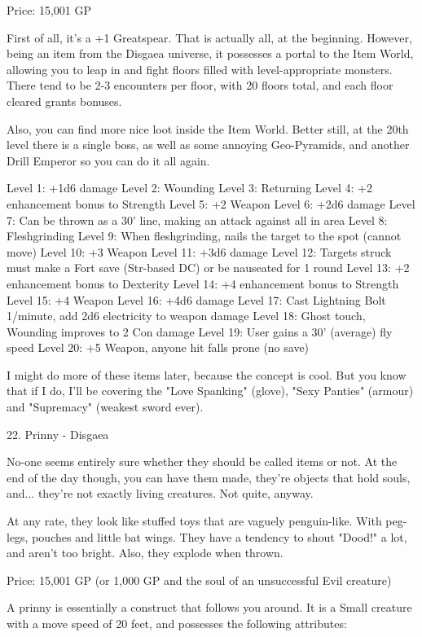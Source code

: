 \begin{multicols}{2}
Price: 15,001 GP

First of all, it's a +1 Greatspear. That is actually all, at the beginning. However, being an item from the Disgaea universe, it possesses a portal to the Item World, allowing you to leap in and fight floors filled with level-appropriate monsters. There tend to be 2-3 encounters per floor, with 20 floors total, and each floor cleared grants bonuses.

Also, you can find more nice loot inside the Item World. Better still, at the 20th level there is a single boss, as well as some annoying Geo-Pyramids, and another Drill Emperor so you can do it all again.

Level 1: +1d6 damage
Level 2: Wounding
Level 3: Returning
Level 4: +2 enhancement bonus to Strength
Level 5: +2 Weapon
Level 6: +2d6 damage
Level 7: Can be thrown as a 30' line, making an attack against all in area
Level 8: Fleshgrinding
Level 9: When fleshgrinding, nails the target to the spot (cannot move)
Level 10: +3 Weapon
Level 11: +3d6 damage
Level 12: Targets struck must make a Fort save (Str-based DC) or be nauseated for 1 round
Level 13: +2 enhancement bonus to Dexterity
Level 14: +4 enhancement bonus to Strength
Level 15: +4 Weapon
Level 16: +4d6 damage
Level 17: Cast Lightning Bolt 1/minute, add 2d6 electricity to weapon damage
Level 18: Ghost touch, Wounding improves to 2 Con damage
Level 19: User gains a 30' (average) fly speed
Level 20: +5 Weapon, anyone hit falls prone (no save)

I might do more of these items later, because the concept is cool. But you know that if I do, I'll be covering the "Love Spanking" (glove), "Sexy Panties" (armour) and "Supremacy" (weakest sword ever).


22. Prinny - Disgaea

No-one seems entirely sure whether they should be called items or not. At the end of the day though, you can have them made, they're objects that hold souls, and... they're not exactly living creatures. Not quite, anyway.

At any rate, they look like stuffed toys that are vaguely penguin-like. With peg-legs, pouches and little bat wings. They have a tendency to shout "Dood!" a lot, and aren't too bright. Also, they explode when thrown.

Price: 15,001 GP (or 1,000 GP and the soul of an unsuccessful Evil creature)

A prinny is essentially a construct that follows you around. It is a Small creature with a move speed of 20 feet, and possesses the following attributes:


\end{multicols}

